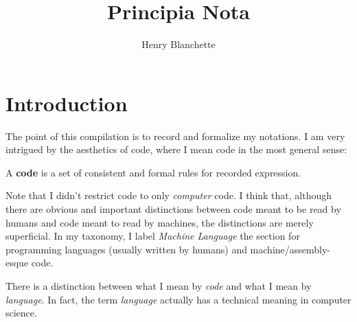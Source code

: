 \documentclass{article}
\title{Principia Nota}
\author{Henry Blanchette}
\date{}
\newcommand{\definition}[1]{
	\vspace{10px}
	\noindent {[\sc Definition]} #1
	\vspace{10px}
}
\begin{document}
\restoregeometry %
\nopagecolor%


\newpage
\tableofcontents

\newpage

\section{Introduction}

The point of this compilation is to record and formalize my notations. I am very intrigued by the aesthetics of code, where I mean code in the most general sense:

\definition{A \textbf{code} is a set of consistent and formal rules for recorded expression.}

Note that I didn't restrict code to only \textit{computer} code. I think that, although there are obvious and important distinctions between code meant to be read by humans and code meant to read by machines, the distinctions are merely superficial. In my taxonomy, I label \textit{Machine Language} the section for programming languages (usually written by humans) and machine/assembly-esque code.

There is a distinction between what I mean by \textit{code} and what I mean by \textit{language}. In fact, the term \textit{language} actually has a technical meaning in computer science.

\newpage
\end{document}
